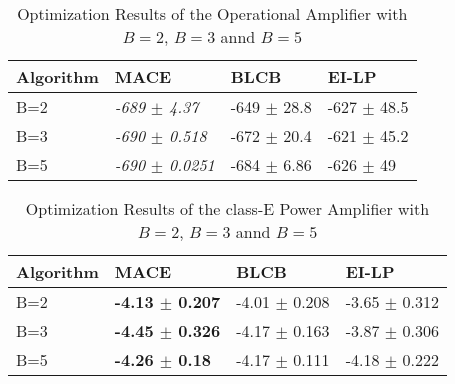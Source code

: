 \begin{table*}[!htb]
    \centering
    \caption{Optimization Results of the Operational Amplifier with $B = 2$, $B = 3$ annd $B = 5$}
    \label{tab:result_opamp_vary_B}
    \begin{tabular}{llll}
        \toprule
        Algorithm & MACE                        & BLCB                & EI-LP               \\ \midrule
        B=2       & \emph{-689  $\pm$  4.37}    &  -649  $\pm$  28.8  &  -627  $\pm$  48.5  \\
        B=3       & \emph{-690  $\pm$  0.518}   &  -672  $\pm$  20.4  &  -621  $\pm$  45.2  \\
        B=5       & \emph{-690  $\pm$  0.0251}  &  -684  $\pm$  6.86  &  -626  $\pm$  49    \\




        \bottomrule
    \end{tabular}
\end{table*}


\begin{table*}[!htb]
    \centering
    \caption{Optimization Results of the class-E Power Amplifier with $B = 2$, $B = 3$ annd $B = 5$}
    \label{tab:result_classE_vary_B}
    \begin{tabular}{llll}
        \toprule
        Algorithm     & MACE                       & BLCB                        & EI-LP          \\
        \midrule
        B=2       & \textbf{-4.13  $\pm$  0.207}  &  -4.01  $\pm$  0.208  &  -3.65  $\pm$  0.312  \\
        B=3       & \textbf{-4.45  $\pm$  0.326}  &  -4.17  $\pm$  0.163  &  -3.87  $\pm$  0.306  \\
        B=5       & \textbf{-4.26  $\pm$  0.18 }  &  -4.17  $\pm$  0.111  &  -4.18  $\pm$  0.222  \\
        \bottomrule
    \end{tabular}
\end{table*}
